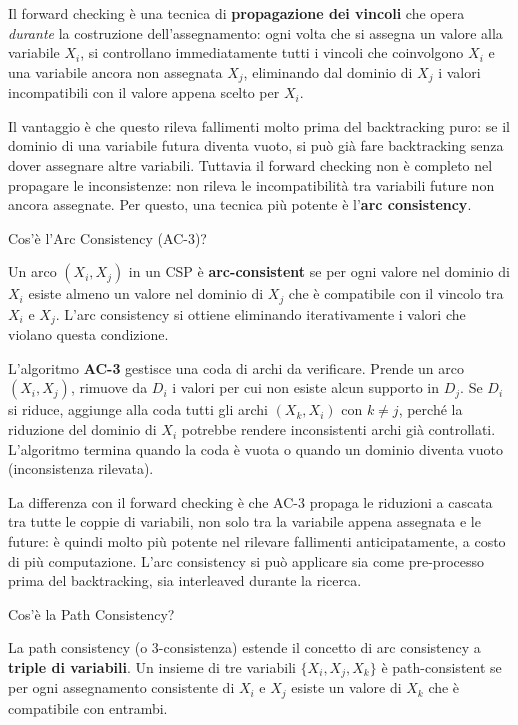 \documentclass[12pt,a4paper]{article}
\begin{document}
Il forward checking è una tecnica di \textbf{propagazione dei vincoli} che opera \emph{durante} la costruzione dell'assegnamento: ogni volta che si assegna un valore alla variabile $X_i$, si controllano immediatamente tutti i vincoli che coinvolgono $X_i$ e una variabile ancora non assegnata $X_j$, eliminando dal dominio di $X_j$ i valori incompatibili con il valore appena scelto per $X_i$.

Il vantaggio è che questo rileva fallimenti molto prima del backtracking puro: se il dominio di una variabile futura diventa vuoto, si può già fare backtracking senza dover assegnare altre variabili. Tuttavia il forward checking non è completo nel propagare le inconsistenze: non rileva le incompatibilità tra variabili future non ancora assegnate. Per questo, una tecnica più potente è l'\textbf{arc consistency}.

\begin{domandabox}{Cos'è l'Arc Consistency (AC-3)?}
\end{domandabox}

Un arco $(X_i, X_j)$ in un CSP è \textbf{arc-consistent} se per ogni valore nel dominio di $X_i$ esiste almeno un valore nel dominio di $X_j$ che è compatibile con il vincolo tra $X_i$ e $X_j$. L'arc consistency si ottiene eliminando iterativamente i valori che violano questa condizione.

L'algoritmo \textbf{AC-3} gestisce una coda di archi da verificare. Prende un arco $(X_i, X_j)$, rimuove da $D_i$ i valori per cui non esiste alcun supporto in $D_j$. Se $D_i$ si riduce, aggiunge alla coda tutti gli archi $(X_k, X_i)$ con $k \neq j$, perché la riduzione del dominio di $X_i$ potrebbe rendere inconsistenti archi già controllati. L'algoritmo termina quando la coda è vuota o quando un dominio diventa vuoto (inconsistenza rilevata).

La differenza con il forward checking è che AC-3 propaga le riduzioni a cascata tra tutte le coppie di variabili, non solo tra la variabile appena assegnata e le future: è quindi molto più potente nel rilevare fallimenti anticipatamente, a costo di più computazione. L'arc consistency si può applicare sia come pre-processo prima del backtracking, sia interleaved durante la ricerca.

\begin{domandabox}{Cos'è la Path Consistency?}
\end{domandabox}

La path consistency (o 3-consistenza) estende il concetto di arc consistency a \textbf{triple di variabili}. Un insieme di tre variabili $\{X_i, X_j, X_k\}$ è path-consistent se per ogni assegnamento consistente di $X_i$ e $X_j$ esiste un valore di $X_k$ che è compatibile con entrambi.
\end{document}
